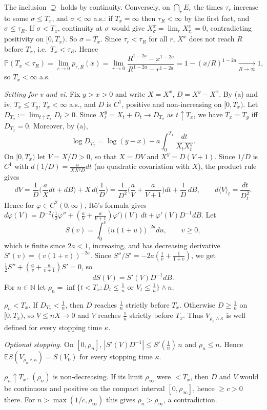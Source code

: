 \documentclass[11pt,a4paper]{article}
\newcommand{\E}{\mathbb{E}}
\renewcommand{\P}{\mathbb{P}}
\newcommand{\N}{\mathbb{N}}
\newcommand{\1}{\mathbf{1}}
\begin{document}
The inclusion $\supseteq$ holds by continuity. Conversely, on $\bigcap_rE_r$ the times $\tau_r$ increase to some
$\sigma\le T_x$, and $\sigma<\infty$ a.s.: if $T_x=\infty$ then $\tau_R<\infty$ by the first fact, and
$\sigma\le\tau_R$. If $\sigma<T_x$, continuity at $\sigma$ would give $X^x_\sigma=\lim_rX^x_{\tau_r}=0$, contradicting
positivity on $[0,T_x)$. So $\sigma=T_x$. Since $\tau_r<\tau_R$ for all $r$, $X^x$ does not reach $R$ before $T_x$,
i.e.\ $T_x<\tau_R$. Hence
\[\P(T_x<\tau_R)=\lim_{r\to0}p_{r,R}(x)=\lim_{r\to0}\frac{R^{1-2a}-x^{1-2a}}{R^{1-2a}-r^{1-2a}}=1-(x/R)^{1-2a}\xrightarrow[R\to\infty]{}1,\]
so $T_x<\infty$ a.s.

\emph{Setting for v and vi.} Fix $y>x>0$ and write $X=X^x$, $D=X^y-X^x$. By (a) and iv, $T_x\le T_y$,
$T_x<\infty$ a.s., and $D$ is $C^1$, positive and non-increasing on $[0,T_x)$. Let $D_{T_x}:=\lim_{t\uparrow T_x}D_t\ge0$.
Since $X^y_t=X_t+D_t\to D_{T_x}$ as $t\uparrow T_x$, we have $T_x=T_y$ iff $D_{T_x}=0$. Moreover, by (a),
\[\log D_{T_x}=\log(y-x)-a\int_0^{T_x}\frac{dt}{X_tX^y_t}.\tag{$\dagger$}\]
On $[0,T_x)$ let $V=X/D>0$, so that $X=DV$ and $X^y=D(V+1)$. Since $1/D$ is $C^1$ with
$d(1/D)=\frac{a}{XX^yD}dt$ (no quadratic covariation with $X$), the product rule gives
\[
dV=\frac1D\Big(\frac aXdt+dB\Big)+X\,d\Big(\frac1D\Big)
=\frac{1}{D^2}\Big(\frac aV+\frac a{V+1}\Big)dt+\frac1D\,dB,\qquad d\langle V\rangle_t=\frac{dt}{D_t^2}.
\]
Hence for $\varphi\in C^2(0,\infty)$, Itô's formula gives
$d\varphi(V)=D^{-2}\big(\tfrac12\varphi''+(\tfrac aV+\tfrac a{V+1})\varphi'\big)(V)\,dt+\varphi'(V)D^{-1}dB$. Let
\[
S(v)=\int_0^v\big(u(1+u)\big)^{-2a}du,\qquad v\ge0,
\]
which is finite since $2a<1$, increasing, and has decreasing derivative $S'(v)=(v(1+v))^{-2a}$. Since
$S''/S'=-2a(\frac1v+\frac1{1+v})$, we get $\frac12S''+(\frac av+\frac a{v+1})S'=0$, so
\[dS(V)=S'(V)D^{-1}dB.\]
For $n\in\N$ let $\rho_n=\inf\{t<T_x:D_t\le\frac1n\text{ or }V_t\le\frac1n\}\wedge n$.

\emph{$\rho_n<T_x$.} If $D_{T_x}<\frac1n$, then $D$ reaches $\frac1n$ strictly before $T_x$. Otherwise
$D\ge\frac1n$ on $[0,T_x)$, so $V\le nX\to0$ and $V$ reaches $\frac1n$ strictly before $T_x$. Thus $V_{\rho_n\wedge\kappa}$
is well defined for every stopping time $\kappa$.

\emph{Optional stopping.} On $[0,\rho_n]$, $|S'(V)D^{-1}|\le S'(\frac1n)\,n$ and $\rho_n\le n$. Hence
$\E S(V_{\rho_n\wedge\kappa})=S(V_0)$ for every stopping time $\kappa$.

\emph{$\rho_n\uparrow T_x$.} $(\rho_n)$ is non-decreasing. If its limit $\rho_\infty$ were $<T_x$, then $D$ and $V$
would be continuous and positive on the compact interval $[0,\rho_\infty]$, hence $\ge c>0$ there. For $n>\max(1/c,\rho_\infty)$
this gives $\rho_n>\rho_\infty$, a contradiction.
\end{document}
